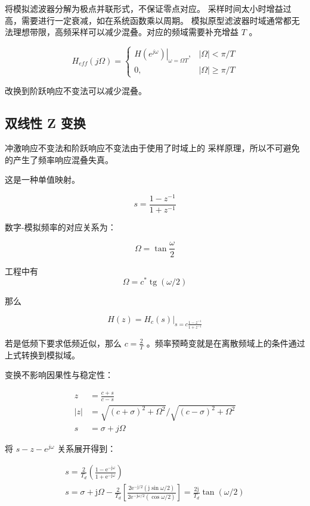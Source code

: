 \documentclass[cn,11pt,chinese,black,simple]{elegantbook}
\begin{document}
将模拟滤波器分解为极点并联形式，不保证零点对应。
采样时间太小时增益过高，需要进行一定衰减，如在系统函数乘以周期。
模拟原型滤波器时域通常都无法理想带限，高频采样可以减少混叠。对应的频域需要补充增益 \(T\) 。


\[
H_{e f f}(j \Omega)=\left\{\begin{array}{cc}
\left.H\left(e^{j \omega}\right)\right|_{\omega=\Omega T}, & |\Omega|<\pi / T \\
0, & |\Omega| \geq \pi / T
\end{array}\right.
\]

改换到阶跃响应不变法可以减少混叠。


\subsection{双线性 Z 变换}

冲激响应不变法和阶跃响应不变法由于使用了时域上的
采样原理，所以不可避免的产生了频率响应混叠失真。

这是一种单值映射。

\[
s=\frac{1-z^{-1}}{1+z^{-1}}
\]

数字-模拟频率的对应关系为：

\[\Omega = \tan \frac{\omega}{2}\]

工程中有 \[
    \Omega=c^{*} \operatorname{tg}(\omega / 2)
    \]

那么

\[
H(z)=\left.H_{c}(s)\right|_{s=c \frac{1-z^{-1}}{1+z^{-1}}} 
\]

若是低频下要求低频近似，那么 \({c = \frac{2}{T}}\) 。频率预畸变就是在离散频域上的条件通过上式转换到模拟域。

变换不影响因果性与稳定性：

\[
\begin{aligned}
z & =\frac{c+s}{c-s} \\
|z| &=\sqrt{(c+\sigma)^{2}+\Omega^{2}} / \sqrt{(c-\sigma)^{2}+\Omega^{2}} \\ 
s &= \sigma + j \Omega
\end{aligned}
\]

将 \(s-z-e^{j\omega}\) 关系展开得到：

\[
\begin{array}{c}
s=\frac{2}{T_{d}}\left(\frac{1-\mathrm{e}^{-\mathrm{j} \omega}}{1+\mathrm{e}^{-\mathrm{j} \omega}}\right) \\
s=\sigma+\mathrm{j} \Omega-\frac{2}{T_{d}}\left[\frac{2 \mathrm{e}^{-\mathrm{j} / 2}(\mathrm{j} \sin \omega / 2)}{2 \mathrm{e}^{-\mathrm{j} \omega / 2}(\cos \omega / 2)}\right]=\frac{2 \mathrm{j}}{T_{d}} \tan (\omega / 2)
\end{array}
\]
\end{document}
